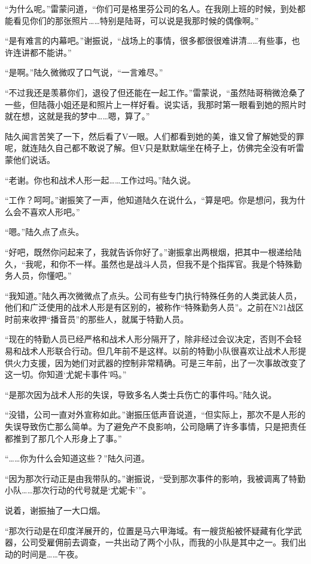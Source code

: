 “为什么呢。”雷蒙问道，“你们可是格里芬公司的名人。在我刚上班的时候，到处都能看见你们的那张照片……特别是陆哥，可以说是我那时候的偶像啊。”

“是有难言的内幕吧。”谢振说，“战场上的事情，很多都很很难讲清……有些事，也许连讲都不能讲。”

“是啊。”陆久微微叹了口气说，“一言难尽。”

“不过我还是羡慕你们，退役了但还能在一起工作。”雷蒙说，“虽然陆哥稍微沧桑了一些，但陆薇小姐还是和照片上一样好看。说实话，我那时第一眼看到她的照片时就在想，这就是我的梦中……嗯，算了。”

陆久闻言苦笑了一下，然后看了V一眼。人们都看到她的美，谁又曾了解她受的罪呢，就连陆久自己都不敢说了解。但V只是默默端坐在椅子上，仿佛完全没有听雷蒙他们说话。

“老谢。你也和战术人形一起……工作过吗。”陆久说。

“工作？呵呵。”谢振笑了一声，他知道陆久在说什么，“算是吧。你是想问，我为什么会不喜欢人形吧。”

“嗯。”陆久点了点头。

“好吧，既然你问起来了，我就告诉你好了。”谢振拿出两根烟，把其中一根递给陆久，“我呢，和你不一样。虽然也是战斗人员，但我不是个指挥官。我是个特殊勤务人员，你懂吧。”

“我知道。”陆久再次微微点了点头。公司有些专门执行特殊任务的人类武装人员，他们和广泛使用的战术人形是有区别的，被称作“特殊勤务人员”。之前在N21战区时前来收押“播音员”的那些人，就属于特勤人员。

“现在的特勤人员已经严格和战术人形分隔开了，除非经过会议决定，否则不会轻易和战术人形联合行动。但几年前不是这样。以前的特勤小队很喜欢让战术人形提供火力支援，因为她们对武器的控制非常精确。可是三年前，出了一次事故改变了这一切。你知道‘尤妮卡事件’吗。”

“是那次因为战术人形的失误，导致多名人类士兵伤亡的事件吗。”陆久说。

“没错，公司一直对外宣称如此。”谢振压低声音说道，“但实际上，那次不是人形的失误导致伤亡那么简单。为了避免产不良影响，公司隐瞒了许多事情，只是把责任都推到了那几个人形身上了事。”

“……你为什么会知道这些？”陆久问道。

“因为那次行动正是由我带队的。”谢振说，“受到那次事件的影响，我被调离了特勤小队……那次行动的代号就是‘尤妮卡’”。

说着，谢振抽了一大口烟。

“那次行动是在印度洋展开的，位置是马六甲海域。有一艘货船被怀疑藏有化学武器，公司受雇佣前去调查，一共出动了两个小队，而我的小队是其中之一。我们出动的时间是……午夜。

